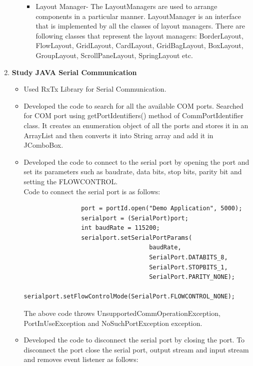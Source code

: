 \documentclass[a4paper,12pt,oneside]{book}
\begin{document}
\begin{enumerate}
\begin{itemize}
\begin{itemize}
				\item Layout Manager- The LayoutManagers are used to arrange components in a particular manner. LayoutManager is an interface that is implemented by all the classes of layout managers. There are following classes that represent the layout managers: BorderLayout, FlowLayout, GridLayout, CardLayout, GridBagLayout, BoxLayout, GroupLayout, ScrollPaneLayout, SpringLayout etc.
			\end{itemize}
		\end{itemize}
		\item \textbf{\large Study JAVA Serial Communication} 
		\begin{itemize}
			\item Used RxTx Library for Serial Communication.
			\item Developed the code to search for all the available COM ports. Searched for COM port using getPortIdentifiers() method of CommPortIdentifier class. It creates an enumeration object of all the ports and stores it in an ArrayList and then converts it into String array and add it in JComboBox. 
		    \item Developed the code to connect to the serial port by opening the port and set its parameters such as baudrate, data bits, stop bits, parity bit and setting the FLOWCONTROL. \\
		    Code to connect the serial port is as follows:
		    \newpage
		    \begin{flushleft}
		    	\lstset{language=Java, showspaces=false,
		    		showstringspaces=false, tabsize=1, breaklines=true}
		    	\begin{lstlisting}
		    	port = portId.open("Demo Application", 5000); 
		    	serialport = (SerialPort)port; 
		    	int baudRate = 115200; 
		    	serialport.setSerialPortParams( 
		    	                   baudRate, 
		    	                   SerialPort.DATABITS_8, 
		    	                   SerialPort.STOPBITS_1, 
		    	                   SerialPort.PARITY_NONE); 
		    	serialport.setFlowControlMode(SerialPort.FLOWCONTROL_NONE); 
		    	\end{lstlisting}
		    \end{flushleft}
		    The above code throws UnsupportedCommOperationException, PortInUseException and NoSuchPortException exception.
			\item Developed the code to disconnect the serial port by closing the port. To disconnect the port close the serial port, output stream and input stream and removes event listener as follows: 
			\begin{flushleft}

\end{flushleft}
\end{itemize}
\end{enumerate}
\end{document}
